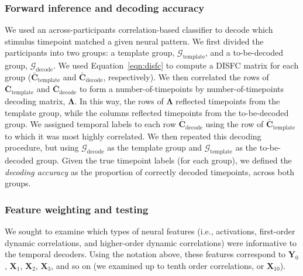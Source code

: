 \documentclass[english]{article}
\begin{document}
\subsubsection*{Forward inference and decoding accuracy}
We used an across-participants correlation-based classifier to decode
which stimulus timepoint matched a given neural pattern.  We first
divided the participants into two groups: a template group,
$\mathcal{G}_{\mathrm{template}}$, and a to-be-decoded group,
$\mathcal{G}_{\mathrm{decode}}$.  We used Equation~\ref{eqn:disfc} to
compute a DISFC matrix for each group
($\bar{\textbf{C}}_{\mathrm{template}}$ and
$\bar{\textbf{C}}_{\mathrm{decode}}$, respectively).  We then
correlated the rows of $\bar{\textbf{C}}_{\mathrm{template}}$ and
$\bar{\textbf{C}}_{\mathrm{decode}}$ to form a number-of-timepoints by
number-of-timepoints decoding matrix, $\mathbf{\Lambda}$.  In this
way, the rows of $\mathbf{\Lambda}$ reflected timepoints from the
template group, while the columns reflected timepoints from the
to-be-decoded group.  We assigned temporal labels to each row
$\bar{\textbf{C}}_{\mathrm{decode}}$ using the row of
$\bar{\textbf{C}}_{\mathrm{template}}$ to which it was most highly
correlated.  We then repeated this decoding procedure, but using
$\mathcal{G}_{\mathrm{decode}}$ as the template group and
$\mathcal{G}_{\mathrm{template}}$ as the to-be-decoded group.  Given
the true timepoint labels (for each group), we defined the
\textit{decoding accuracy} as the proportion of correctly decoded
timepoints, across both groups.

\subsubsection*{Feature weighting and testing}
We sought to examine which types of neural features (i.e.,
activations, first-order dynamic correlations, and higher-order
dynamic correlations) were informative to the temporal decoders.
Using the notation above, these features correspond to $\mathbf{Y}_0$,
$\mathbf{X}_1$, $\mathbf{X}_2$, $\mathbf{X}_3$, and so on (we examined
up to tenth order correlations, or $\mathbf{X}_{10}$).
\end{document}
